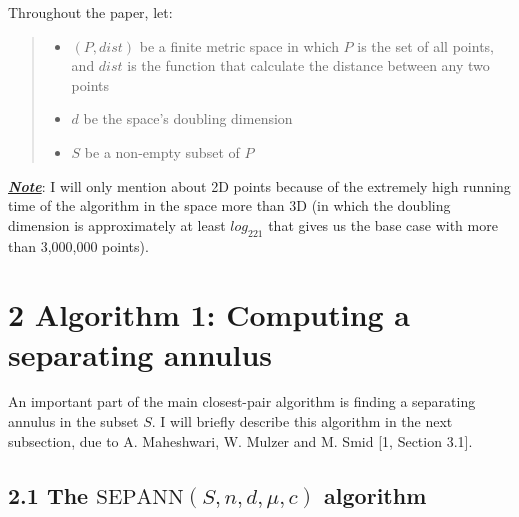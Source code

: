 \documentclass[12pt,english,]{article}
\newcommand{\pnt}[1]{{\scriptstyle#1}}
\begin{document}
\vspace{-2truemm}

Throughout the paper, let:

\vspace{-2truemm}

\begin{quote}
\begin{itemize}
\item $(P, dist)$ be a finite metric space in which $P$ is the set of all points, and $dist$ is the function that calculate the distance between any two points
\item $d$ be the space's doubling dimension
\item $S$ be a non-empty subset of $P$
\end{itemize}
\end{quote}

\vspace{-2truemm}

\underline{\emph{\textbf{Note}}}: I will only mention about 2D points
because of the extremely high running time of the algorithm in the space
more than 3D (in which the doubling dimension is approximately at least
\boldmath\(log_221\) that gives us the base case with more than
3,000,000 points). \unboldmath

\newpage

\hypertarget{algorithm-1-computing-a-separating-annulus}{%
\section{\texorpdfstring{2 \enspace Algorithm 1: Computing a separating
annulus}{2 Algorithm 1: Computing a separating annulus}}\label{algorithm-1-computing-a-separating-annulus}}

An important part of the main closest-pair algorithm is finding a
separating annulus in the subset \(S\). I will briefly describe this
algorithm in the next subsection, due to A. Maheshwari, W. Mulzer and M.
Smid {[}1, Section 3.1{]}.

\hypertarget{the-mathrmspntepapntnnsndmuc-algorithm}{%
\subsection{\texorpdfstring{2.1 The
\(\mathrm{S\pnt{EP}A\pnt{NN}}(S,n,d,\mu,c)\)
algorithm}{2.1 The \textbackslash{}mathrm\{S\textbackslash{}pnt\{EP\}A\textbackslash{}pnt\{NN\}\}(S,n,d,\textbackslash{}mu,c) algorithm}}\label{the-mathrmspntepapntnnsndmuc-algorithm}}
\end{document}
